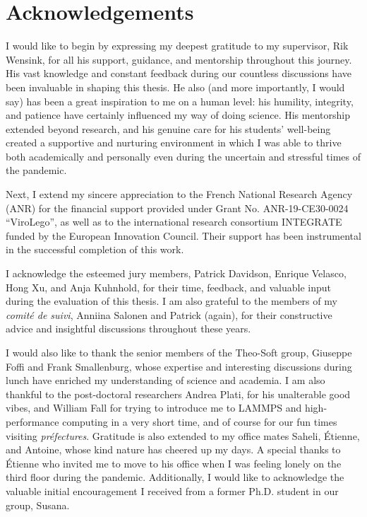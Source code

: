 
\chapter{Acknowledgements}

I would like to begin by expressing my deepest gratitude to my supervisor, Rik Wensink, for all his support, guidance, and mentorship throughout this journey. His vast knowledge and constant feedback during our countless discussions have been invaluable in shaping this thesis. He also (and more importantly, I would say) has been a great inspiration to me on a human level: his humility, integrity, and patience have certainly influenced my way of doing science. His mentorship extended beyond research, and his genuine care for his students' well-being created a supportive and nurturing environment in which I was able to thrive both academically and personally even during the uncertain and stressful times of the pandemic.

Next, I extend my sincere appreciation to the French National Research Agency (ANR) for the financial support provided under Grant No. ANR-19-CE30-0024 “ViroLego”, as well as to the international research consortium INTEGRATE funded by the European Innovation Council. Their support has been instrumental in the successful completion of this work.

I acknowledge the esteemed jury members, Patrick Davidson, Enrique Velasco, Hong Xu, and Anja Kuhnhold, for their time, feedback, and valuable input during the evaluation of this thesis. I am also grateful to the members of my {\em comité de suivi}, Anniina Salonen and Patrick (again), for their constructive advice and insightful discussions throughout these years.

I would also like to thank the senior members of the Theo-Soft group, Giuseppe Foffi and Frank Smallenburg, whose expertise and interesting discussions during lunch have enriched my understanding of science and academia. I am also thankful to the post-doctoral researchers Andrea Plati, for his unalterable good vibes, and William Fall for trying to introduce me to LAMMPS and high-performance computing in a very short time, and of course for our fun times visiting {\em préfectures}. Gratitude is also extended to my office mates Saheli, Étienne, and Antoine, whose kind nature has cheered up my days. A special thanks to Étienne who invited me to move to his office when I was feeling lonely on the third floor during the pandemic. Additionally, I would like to acknowledge the valuable initial encouragement I received from a former Ph.D. student in our group, Susana.

